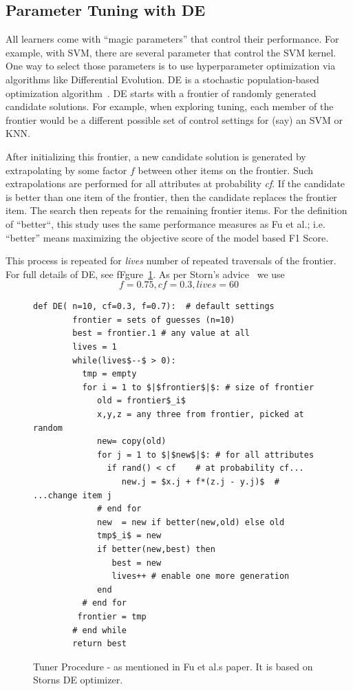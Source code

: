 \documentclass[sigconf]{acmart}
\theoremstyle{break}
\begin{document}
    \subsection{Parameter Tuning with DE}
    \label{sssec:Parameter Tuning with DE}
    All learners come with ``magic parameters'' that control their performance.
    For example, with SVM, there are several parameter that control the SVM kernel.
    One way to select those parameters is to use hyperparameter optimization via
    algorithms like  
    Differential Evolution. DE is a stochastic population-based optimization algorithm~\cite{storn1997differential}. DE starts with a frontier of randomly
    generated candidate solutions.
    For example, when exploring tuning, each member of the frontier would be a different possible set of control settings for (say) an SVM or KNN.
    
    After initializing this frontier, a new candidate solution is generated by extrapolating
    by some factor $f$ between other items on the frontier. Such extrapolations are
    performed for all attributes at probability {\em cf}.
    If the candidate is better than one item of the frontier, then the candidate replaces the frontier item. The search then repeats for the remaining frontier items.
    For the definition of ``better``, this study uses the same performance measures as Fu et al.; i.e. 
   ``better'' means maximizing  the objective score of the model based F1 Score.
    
    
    This process is repeated for {\em lives} number of repeated traversals of the frontier.
        For full details of DE,  see fFgure~\ref{fig:pseudo_DE}. As per Storn's advice~\cite{storn1997differential} we use \[f=0.75, \mathit{cf}=0.3,
    \mathit{lives}=60\]

    
 
    
    \begin{figure}[!t]
    \small 
    \begin{lstlisting}[mathescape,linewidth=7.5cm,frame=none,numbers=right ]
      def DE( n=10, cf=0.3, f=0.7):  # default settings
        frontier = sets of guesses (n=10)
        best = frontier.1 # any value at all
        lives = 1
        while(lives$--$ > 0): 
          tmp = empty
          for i = 1 to $|$frontier$|$: # size of frontier
             old = frontier$_i$
             x,y,z = any three from frontier, picked at random
             new= copy(old)  
             for j = 1 to $|$new$|$: # for all attributes
               if rand() < cf    # at probability cf...
                  new.j = $x.j + f*(z.j - y.j)$  # ...change item j
             # end for
             new  = new if better(new,old) else old
             tmp$_i$ = new 
             if better(new,best) then
                best = new
                lives++ # enable one more generation
             end                  
          # end for
         frontier = tmp
        # end while
        return best
    \end{lstlisting} 
    \caption{Tuner Procedure - as mentioned in Fu et al.\textquotesingle s paper. It is based on Storn\textquotesingle s DE optimizer.}
    \label{fig:pseudo_DE} 
    \vspace{-0.3cm}
    \end{figure}
    
\end{document}
